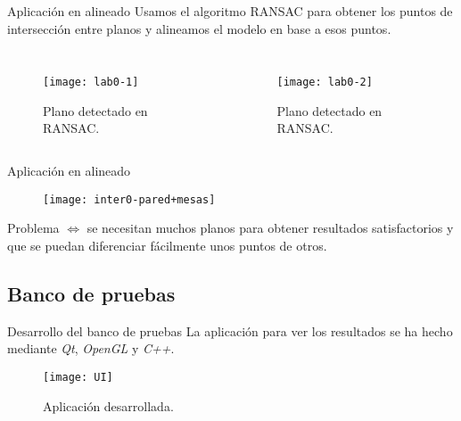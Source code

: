\documentclass[9pt]{beamer}
\begin{document}
	\begin{frame}{Aplicación en alineado}
		Usamos el algoritmo RANSAC para obtener los puntos de intersección entre planos y alineamos el modelo en base a esos puntos.
		\begin{columns}
			\begin{figure}[h!]
				\texttt{[image: lab0-1]}
				\caption{Plano detectado en RANSAC.}
			\end{figure}
			\begin{figure}[h!]
				\texttt{[image: lab0-2]}
				\caption{Plano detectado en RANSAC.}
			\end{figure} 
		\end{columns}
	\end{frame}
	\begin{frame}{Aplicación en alineado}
	\begin{figure}[h!]
		\texttt{[image: inter0-pared+mesas]}		
	\end{figure} 

	Problema $ \Longleftrightarrow $ se necesitan muchos planos para obtener resultados satisfactorios y que se puedan diferenciar fácilmente unos puntos de otros.
	
	\end{frame}

	\subsection{Banco de pruebas}
	\begin{frame}{Desarrollo del banco de pruebas}
		La aplicación para ver los resultados se ha hecho mediante \textit{Qt}, \textit{OpenGL} y \textit{C++}.
		\begin{figure}[h!]
			\texttt{[image: UI]}
			\caption{Aplicación desarrollada.}
		\end{figure} 
	\end{frame}
\end{document}
